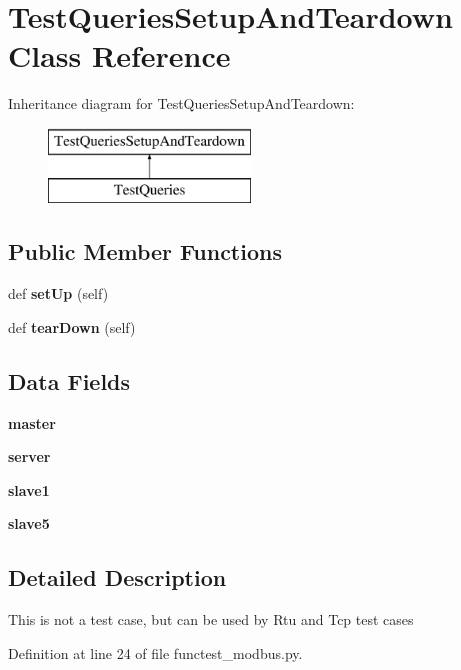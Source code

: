 \section{Test\+Queries\+Setup\+And\+Teardown Class Reference}
\label{classtests_1_1functest__modbus_1_1_test_queries_setup_and_teardown}
Inheritance diagram for Test\+Queries\+Setup\+And\+Teardown\+:\begin{figure}[H]
\begin{center}
\leavevmode
\includegraphics[height=2.000000cm]{classtests_1_1functest__modbus_1_1_test_queries_setup_and_teardown}
\end{center}
\end{figure}
\subsection*{Public Member Functions}
\begin{DoxyCompactItemize}
\item 
def {\bf set\+Up} (self)
\item 
def {\bf tear\+Down} (self)
\end{DoxyCompactItemize}
\subsection*{Data Fields}
\begin{DoxyCompactItemize}
\item 
{\bf master}
\item 
{\bf server}
\item 
{\bf slave1}
\item 
{\bf slave5}
\end{DoxyCompactItemize}


\subsection{Detailed Description}
\begin{DoxyVerb}This is not a test case, but can be used by Rtu and Tcp test cases\end{DoxyVerb}
 

Definition at line 24 of file functest\+\_\+modbus.\+py.



